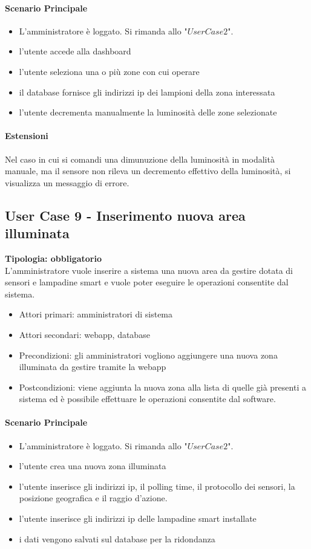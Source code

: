 \documentclass[12pt]{article}
\begin{document}
\paragraph{Scenario Principale}
\begin{itemize}
	\item L'amministratore è loggato. Si rimanda allo "$User Case 2$".
	\item l'utente accede alla dashboard
	\item l'utente seleziona una o più zone con cui operare
 	\item il database fornisce gli indirizzi ip dei lampioni della zona interessata
	\item l'utente decrementa manualmente la luminosità delle zone selezionate
\end{itemize}
\paragraph{Estensioni} Nel caso in cui si comandi una dimunuzione della luminosità in modalità manuale, ma il sensore non rileva un decremento effettivo della luminosità, si visualizza un messaggio di errore.
\subsection{User Case 9 - Inserimento nuova area illuminata}
\textbf{Tipologia: obbligatorio} \\
L'amministratore vuole inserire a sistema una nuova area da gestire dotata di sensori e lampadine smart e vuole poter eseguire le operazioni consentite dal sistema.
\begin{itemize}
	\item Attori primari: amministratori di sistema
	\item Attori secondari: webapp, database
	\item Precondizioni: gli amministratori vogliono aggiungere una nuova zona illuminata da gestire tramite la webapp
	\item Postcondizioni: viene aggiunta la nuova zona alla lista di quelle già presenti a sistema ed è possibile effettuare le operazioni consentite dal software.
\end{itemize}
\paragraph{Scenario Principale}
\begin{itemize}
	\item L'amministratore è loggato. Si rimanda allo "$User Case 2$".
	\item l'utente crea una nuova zona illuminata
	\item l'utente inserisce gli indirizzi ip, il polling time, il protocollo dei sensori, la posizione geografica e il raggio d'azione.
	\item l'utente inserisce gli indirizzi ip delle lampadine smart installate
	\item i dati vengono salvati sul database per la ridondanza
\end{itemize}
\end{document}
